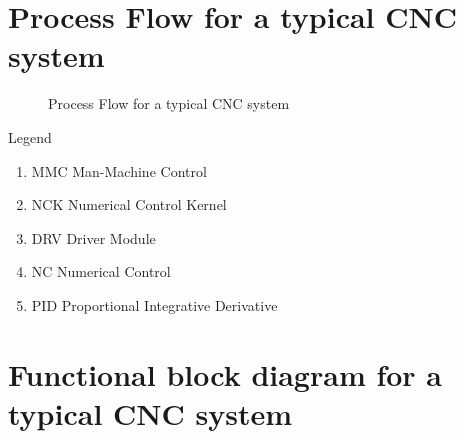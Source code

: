 \pagebreak
\clearpage
\section{Process Flow for a typical CNC system}

\begin{figure}[htbp]
	\begin{center}
		\caption{Process Flow for a typical CNC system}
		\label{fig:CNC-Typical-Software-Control-Flow-Diagram.jpg}
	\end{center}
\end{figure}

Legend\\
\begin{enumerate}
	\item MMC Man-Machine Control
	\item NCK Numerical Control Kernel
	\item DRV Driver Module
	\item NC  Numerical Control
	\item PID Proportional Integrative Derivative
\end{enumerate}


\pagebreak
\clearpage
\section{Functional block diagram for a typical CNC system} 

